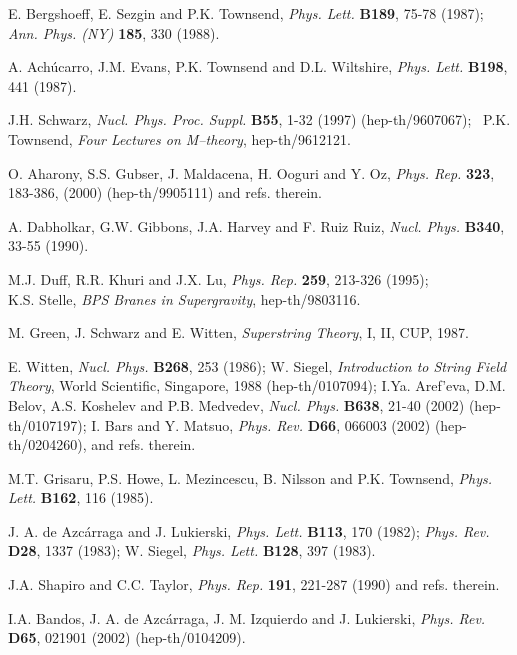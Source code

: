 \documentclass[a4paper,11pt]{article}
\begin{document}
{\small 
\begin{thebibliography}{99}


E. Bergshoeff, E. Sezgin and P.K. Townsend, 
{\em Phys. Lett.} {\bf B189}, 75-78 (1987); {\em Ann. Phys. (NY)} 
{\bf 185}, 330 (1988). 
 
A. Ach\'ucarro, J.M. Evans, P.K. Townsend and D.L. Wiltshire, 
{\em Phys. Lett.} {\bf B198}, 441 (1987).  

J.H. Schwarz, 
{\em Nucl. Phys. Proc. Suppl.} {\bf B55}, 1-32  
(1997) (hep-th/9607067); 
 \, P.K. Townsend, 
{\sl Four Lectures on M--theory}, hep-th/9612121.

O. Aharony, S.S. Gubser, J. Maldacena, H. Ooguri and Y. Oz, 
{\em Phys. Rep.} {\bf  323},  
183-386, (2000) (hep-th/9905111) and refs. therein.  

 A. Dabholkar, G.W. Gibbons, J.A. Harvey and F. Ruiz Ruiz, 
{\em Nucl. Phys.} {\bf B340}, 33-55 (1990).  

M.J. Duff, R.R. Khuri and J.X. Lu, 
{\sl Phys. Rep.} {\bf 259}, 213-326 (1995); \\ 
K.S. Stelle, {\sl BPS Branes in Supergravity}, hep-th/9803116.

M. Green, J. Schwarz and E. Witten, {\sl Superstring Theory}, I, II, 
CUP, 1987. 

E. Witten, 
{\em Nucl. Phys.} {\bf B268}, 253 (1986); 
W. Siegel, {\sl Introduction to String Field Theory}, 
World Scientific, Singapore, 1988 
(hep-th/0107094); 
I.Ya. Aref'eva, D.M. Belov, A.S. Koshelev and P.B. Medvedev, 
{\em Nucl. Phys.} {\bf B638}, 21-40 (2002) (hep-th/0107197);  
I. Bars and Y. Matsuo, 
{\em  Phys. Rev.} {\bf D66}, 066003 (2002) 
(hep-th/0204260), and refs. therein.  

M.T. Grisaru, P.S. Howe, L. Mezincescu, B. Nilsson and P.K. Townsend, 
{\em Phys. Lett.} {\bf B162}, 116 (1985).  

J. A. de Azc\'{a}rraga and J. Lukierski,
{\em Phys. Lett.} {\bf B113}, 170 (1982); 
{\em Phys. Rev.}  {\bf D28}, 1337 (1983); 
W. Siegel, 
{\em Phys. Lett.} {\bf B128}, 397 (1983).   
 
J.A. Shapiro and C.C. Taylor, 
 {\em Phys. Rep.} {\bf 191}, 221-287 (1990) and refs. therein. 

I.A. Bandos, J. A. de 
Azc\'arraga,
J. M. Izquierdo and J. Lukierski, 
{\em Phys. Rev.} {\bf D65}, 021901 (2002) ({hep-th/0104209}). 


\end{thebibliography}}
\end{document}
